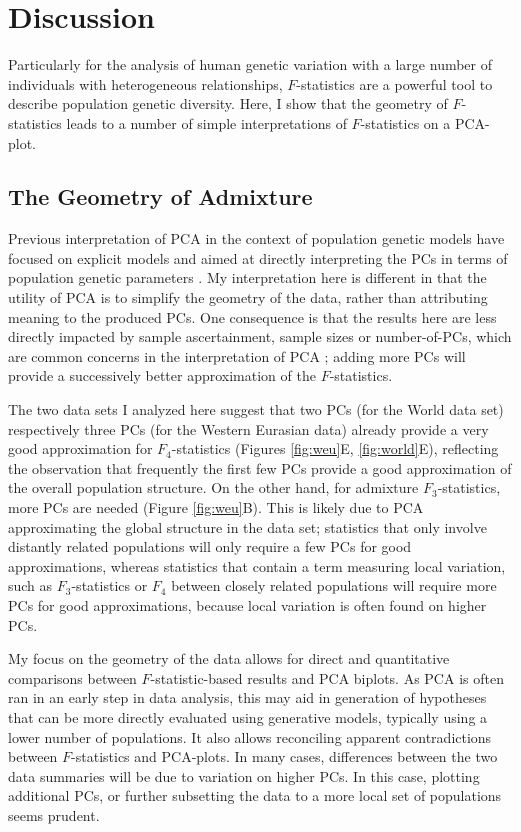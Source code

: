 \documentclass[12pt,fullpage, a4paper]{article}
\begin{document}
\section{Discussion}
Particularly for the analysis of human genetic variation with a large number of individuals with heterogeneous relationships, $F$-statistics  are  a powerful tool to describe population genetic diversity. Here, I show that the geometry of $F$-statistics \citep{oteo-garcia2021} leads to a number of simple interpretations of $F$-statistics on a PCA-plot. 

\subsection{The Geometry of Admixture}
Previous interpretation of PCA in the context of population genetic models have focused on explicit models and aimed at directly interpreting the PCs in terms of population genetic parameters \citep{cavalli-sforza1975, novembre2008a, francois2010, francois2021}. My interpretation here is different in that the utility of PCA is to simplify the geometry of the data, rather than attributing meaning to the produced PCs. One consequence is that the results here are less directly impacted by sample ascertainment, sample sizes or number-of-PCs, which are common concerns in the interpretation of PCA \citep{novembre2008a, mcvean2009, francois2010, francois2021}; adding more PCs will provide a successively better approximation of the $F$-statistics. 


The two data sets I analyzed here suggest that two PCs (for the World data set) respectively three PCs (for the Western Eurasian data) already provide a very good approximation for $F_4$-statistics (Figures \ref{fig:weu}E, \ref{fig:world}E), reflecting the observation that frequently the first few PCs provide a good approximation of the overall population structure. On the other hand, for admixture $F_3$-statistics, more PCs are needed (Figure \ref{fig:weu}B). This is likely due to PCA approximating the global structure in the data set; statistics that only involve distantly related populations will only require a few PCs for good approximations, whereas statistics that contain a term measuring local variation, such as $F_3$-statistics or $F_4$ between closely related populations will require more PCs for good approximations, because local variation is often found on higher PCs.

My focus on the geometry of the data allows for direct and quantitative comparisons between $F$-statistic-based results and PCA biplots. As PCA is often ran in an early step in data analysis, this may aid in generation of hypotheses that can be more directly evaluated using generative models, typically using a lower number of populations. It also allows reconciling apparent contradictions between $F$-statistics and PCA-plots. In many cases, differences between the two data summaries will be due to variation on higher PCs. In this case, plotting additional PCs, or further subsetting the data to a more local set of populations seems prudent. 
\end{document}
